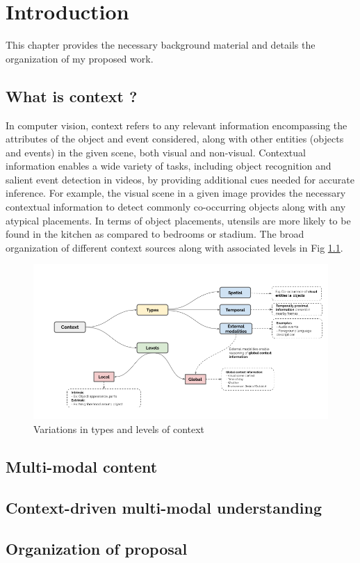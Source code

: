 \chapter{Introduction}
\label{cha:introduction}

This chapter provides the necessary background material and details the organization of my proposed work.

\section{What is context ?}
In computer vision, context \cite{contextvision} refers to any relevant information encompassing the attributes of the object and event considered, along with other entities (objects and events) in the given scene, both visual and non-visual. Contextual information enables a wide variety of tasks, including object recognition and salient event detection in videos, by providing additional cues needed for accurate inference. For example, the visual scene in a given image provides the necessary contextual information to detect commonly co-occurring objects along with any atypical placements. In terms of object placements, utensils are more likely to be found in the kitchen as compared to bedrooms or stadium. The broad organization of different context sources along with associated levels in Fig \ref{Context_type}.
\begin{figure}[t]
  \centering
  \includegraphics[width=\linewidth]{figures/Context_type.png}
  \caption{Variations in types and levels of context}
  \label{Context_type}
\end{figure}
\section{Multi-modal content}
\section{Context-driven multi-modal understanding}
\section{Organization of proposal}

